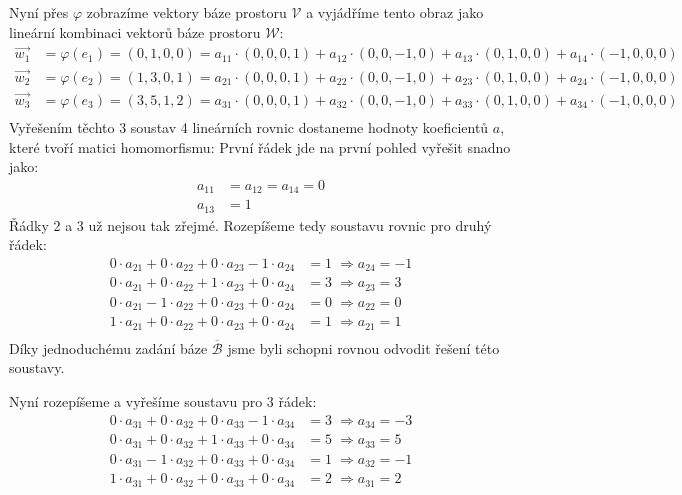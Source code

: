 \begin{example}
    Nyní přes $\varphi$ zobrazíme vektory báze prostoru $\mathcal{V}$ a vyjádříme tento
    obraz jako lineární kombinaci vektorů báze prostoru $\mathcal{W}$:
    \begin{align*}
        \vec{w_1} & = \varphi(e_1) = (0, 1, 0, 0) =
            a_{11} \cdot (0, 0, 0, 1) + a_{12} \cdot (0, 0, -1, 0) + a_{13} \cdot (0, 1, 0, 0) + a_{14} \cdot (-1, 0, 0, 0)\\
        \vec{w_2} & = \varphi(e_2) = (1, 3, 0, 1) =
            a_{21} \cdot (0, 0, 0, 1) + a_{22} \cdot (0, 0, -1, 0) + a_{23} \cdot (0, 1, 0, 0) + a_{24} \cdot (-1, 0, 0, 0)\\
        \vec{w_3} & = \varphi(e_3) = (3, 5, 1, 2) =
            a_{31} \cdot (0, 0, 0, 1) + a_{32} \cdot (0, 0, -1, 0) + a_{33} \cdot (0, 1, 0, 0) + a_{34} \cdot (-1, 0, 0, 0)\\
    \end{align*}
    Vyřešením těchto 3 soustav 4 lineárních rovnic dostaneme hodnoty koeficientů $a$, které tvoří
    matici homomorfismu:
    První řádek jde na první pohled vyřešit snadno jako:
    \begin{align*}
        a_{11} &= a_{12} = a_{14} = 0\\
        a_{13} &= 1
    \end{align*}
    Řádky 2 a 3 už nejsou tak zřejmé. Rozepíšeme tedy soustavu rovnic pro druhý řádek:
    \begin{align*}
        0\cdot a_{21} + 0\cdot a_{22} + 0\cdot a_{23} -1 \cdot a_{24} &= 1\; \Rightarrow a_{24} = -1\\
        0\cdot a_{21} + 0\cdot a_{22} + 1\cdot a_{23} +0 \cdot a_{24} &= 3\; \Rightarrow a_{23} = 3\\
        0\cdot a_{21} - 1 \cdot a_{22} + 0\cdot a_{23} +0 \cdot a_{24} &= 0 \; \Rightarrow a_{22} = 0\\
        1\cdot a_{21} + 0 \cdot a_{22} + 0\cdot a_{23} +0 \cdot a_{24} &= 1 \; \Rightarrow a_{21} = 1\\
    \end{align*}
    Díky jednoduchému zadání báze $\overline{\mathcal{B}}$ jsme byli schopni rovnou odvodit
    řešení této soustavy.

    Nyní rozepíšeme a vyřešíme soustavu pro 3 řádek:
    \begin{align*}
        0\cdot a_{31} + 0\cdot a_{32} + 0\cdot a_{33} -1 \cdot a_{34} &= 3\; \Rightarrow a_{34} = -3\\
        0\cdot a_{31} + 0\cdot a_{32} + 1\cdot a_{33} +0 \cdot a_{34} &= 5\; \Rightarrow a_{33} = 5\\
        0\cdot a_{31} - 1 \cdot a_{32} + 0\cdot a_{33} +0 \cdot a_{34} &= 1 \; \Rightarrow a_{32} = -1\\
        1\cdot a_{31} + 0 \cdot a_{32} + 0\cdot a_{33} +0 \cdot a_{34} &= 2 \; \Rightarrow a_{31} = 2\\
    \end{align*}


\end{example}
